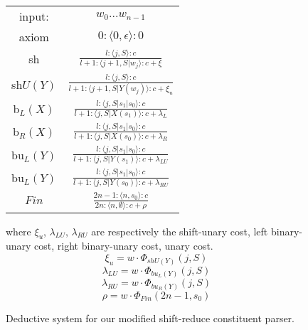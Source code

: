 \begin{figure}[t]
		\begin{tabular}{c c}
		input: & $w_0...w_{n-1}$\\[5pt]
		axiom & $0:\langle0,\epsilon\rangle:0$\\[5pt]
		sh &	
		$\displaystyle \frac{l:\langle j,S\rangle:c}
		{l+1:\langle j+1, S|w_j\rangle:c+\xi}$
		\\[10pt]

		sh$U(Y)$ &	
			$\displaystyle \frac{l:\langle j,S\rangle:c}
			{l+1:\langle j+1, S|Y(w_j)\rangle:c+\xi_u}$
		\\[10pt]
	
		b$_L(X)$ & 
			$\displaystyle \frac{l:\langle j,S|s_1|s_0\rangle:c} 
			{l+1:\langle j, S|X(s_1)\rangle:c+\lambda_L}$					
		\\[10pt]
		
		b$_R(X)$ & 
			$\displaystyle \frac{l:\langle j,S|s_1|s_0\rangle:c}
			{l+1:\langle j, S|X(s_0)\rangle:c+\lambda_R}$
		\\[10pt]
	
		bu$_L(Y)$ & 
			$\displaystyle \frac{l:\langle j,S|s_1|s_0\rangle:c}
			{l+1:\langle j, S|Y(s_1)\rangle:c+\lambda_{LU}}$
		\\[10pt]
		
		bu$_L(Y)$ & 
			$\displaystyle \frac{l:\langle j,S|s_1|s_0\rangle:c}
			{l+1:\langle j, S|Y(s_0)\rangle:c+\lambda_{RU}}$
		\\[10pt]
		
		$Fin$ & 
			$\displaystyle \frac{2n-1:\langle n,s_0\rangle:c}
			{2n:\langle n, \emptyset \rangle:c+\rho}$
		\\[10pt]
		\end{tabular}
	
		where $\xi_u$, $\lambda_{LU}$, $\lambda_{RU}$ are respectively the shift-unary cost, left binary-unary  cost, right binary-unary cost, unary cost.
		\\
		\begin{equation}		\xi_u = w \cdot \Phi_{shU(Y)}(j,S) 	\end{equation}
		\begin{equation}		\lambda_{LU} = w \cdot \Phi_{bu_L(Y)}(j,S) 	\end{equation}
		\begin{equation}		\lambda_{RU} = w \cdot \Phi_{bu_R(Y)}(j,S) 	\end{equation}
		\begin{equation}		\rho = w \cdot \Phi_{Fin}(2n-1,s_0) 	\end{equation}
		
	\caption{\label{deductive_modified}Deductive system for our modified shift-reduce constituent parser.}
\end{figure}